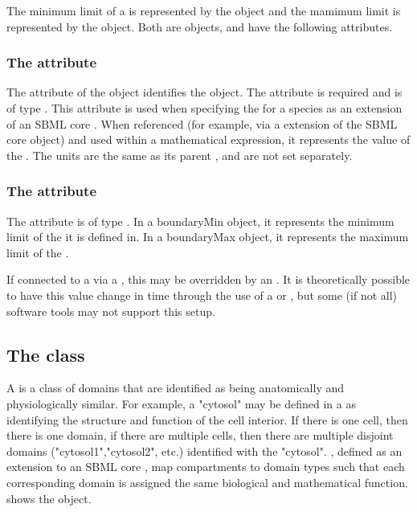 The minimum limit of a \CoordinateComponent is represented by the  object and the mamimum limit is represented by the  object. Both are \Boundary objects, and have the following attributes.

\subsubsection{The  attribute}
The  attribute of the \Boundary object identifies the object. The attribute is required and is of type . This attribute is used when specifying the \BoundaryCondition for a species as an extension of an SBML core \Parameter.   When referenced (for example, via a \SpatialSymbolReference extension of the SBML core \Parameter object) and used within a mathematical expression, it represents the value of the \Boundary.  The units are the same as its parent \CoordinateComponent, and are not set separately.

\subsubsection{The  attribute}
The  attribute is of type . In a boundaryMin object, it represents the minimum limit of the \CoordinateComponent it is defined in. In a boundaryMax object, it represents the maximum limit of the \CoordinateComponent.

If connected to a \Parameter via a \SpatialSymbolReference, this  may be overridden by an \InitialAssignment.  It is theoretically possible to have this value change in time through the use of a \Rule or \Event, but some (if not all) software tools may not support this setup. 



\subsection{The  class}
\label{DomainType-class}
A \DomainType is a class of domains that are identified as being anatomically and physiologically similar.  For example, a \DomainType "cytosol" may be defined in a \Geometry as identifying the structure and function of the cell interior.  If there is one cell, then there is one domain, if there are multiple cells, then there are multiple disjoint domains ("cytosol1","cytosol2", etc.) identified with the \DomainType "cytosol".  \CompartmentMappings, defined as an extension to an SBML core \Compartment, map compartments to domain types such that each corresponding domain is assigned the same biological and mathematical function.  shows the \DomainType object.

